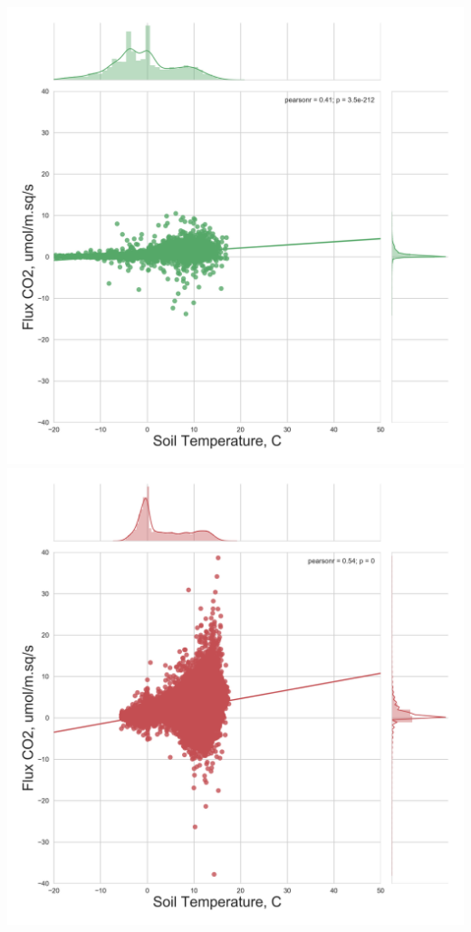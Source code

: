 \documentclass{beamer}
\begin{document}
\begin{frame}
\begin{columns}[t]
\centering
\includegraphics[width=\textwidth]{FvsT_night/CA-NS6.png}\\
\includegraphics[width=\textwidth]{FvsT_night/CA-Oas.png}

\end{columns}
\end{frame}
\end{document}
